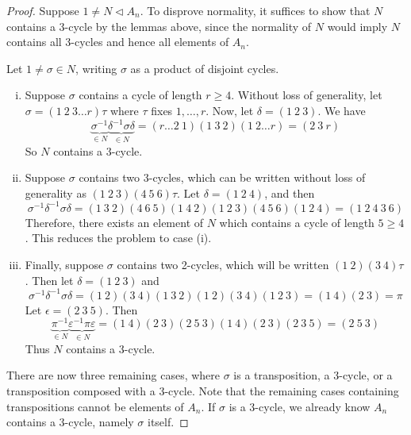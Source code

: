 \begin{proof}
	Suppose \( 1 \neq N \triangleleft A_n \).
	To disprove normality, it suffices to show that \( N \) contains a 3-cycle by the lemmas above, since the normality of \( N \) would imply \( N \) contains all 3-cycles and hence all elements of \( A_n \).

	Let \( 1 \neq \sigma \in N \), writing \( \sigma \) as a product of disjoint cycles.
	\begin{enumerate}[(i)]
		\item Suppose \( \sigma \) contains a cycle of length \( r \geq 4 \).
			Without loss of generality, let \( \sigma = (1\ 2\ 3\dots r) \tau \) where \( \tau \) fixes \( 1, \dots, r \).
			Now, let \( \delta = (1\ 2\ 3) \).
			We have
			\[ \underbrace{\sigma^{-1}}_{\in N} \underbrace{\delta^{-1} \sigma \delta}_{\in N} = (r \dots 2\ 1)(1\ 3\ 2)(1\ 2\dots r) = (2\ 3\ r) \]
			So \( N \) contains a 3-cycle.
		\item Suppose \( \sigma \) contains two 3-cycles, which can be written without loss of generality as \( (1\ 2\ 3)(4\ 5\ 6) \tau \).
			Let \( \delta = (1\ 2\ 4) \), and then
			\[ \sigma^{-1} \delta^{-1} \sigma \delta = (1\ 3\ 2)(4\ 6\ 5)(1\ 4\ 2)(1\ 2\ 3)(4\ 5\ 6)(1\ 2\ 4) = (1\ 2\ 4\ 3\ 6) \]
			Therefore, there exists an element of \( N \) which contains a cycle of length \( 5 \geq 4 \).
			This reduces the problem to case (i).
		\item Finally, suppose \( \sigma \) contains two 2-cycles, which will be written \( (1\ 2)(3\ 4)\tau \).
			Then let \( \delta = (1\ 2\ 3) \) and
			\[ \sigma^{-1} \delta^{-1} \sigma \delta = (1\ 2)(3\ 4)(1\ 3\ 2)(1\ 2)(3\ 4)(1\ 2\ 3) = (1\ 4)(2\ 3) = \pi \]
			Let \( \epsilon = (2\ 3\ 5) \).
			Then
			\[ \underbrace{\pi^{-1}}_{\in N} \underbrace{\varepsilon^{-1} \pi \varepsilon}_{\in N} = (1\ 4)(2\ 3)(2\ 5\ 3)(1\ 4)(2\ 3)(2\ 3\ 5) = (2\ 5\ 3) \]
			Thus \( N \) contains a 3-cycle.
	\end{enumerate}
	There are now three remaining cases, where \( \sigma \) is a transposition, a 3-cycle, or a transposition composed with a 3-cycle.
	Note that the remaining cases containing transpositions cannot be elements of \( A_n \).
	If \( \sigma \) is a 3-cycle, we already know \( A_n \) contains a 3-cycle, namely \( \sigma \) itself.
\end{proof}
